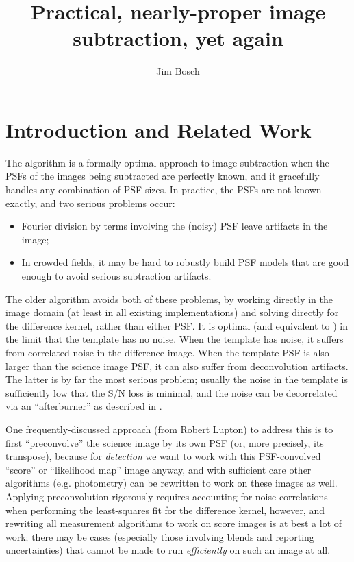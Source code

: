 \documentclass[DM,authoryear,toc]{lsstdoc}
\title{Practical, nearly-proper image subtraction, yet again}
\author{%
Jim Bosch
}
\date{\vcsDate}
\newcommand{\ZOGY}{\citetalias{2016ApJ...830...27Z}}
\newcommand{\AL}{\citetalias{1998ApJ...503..325A}}
\begin{document}
\mkshorttitle

\section{Introduction and Related Work}

The \ZOGY{} algorithm is a formally optimal approach to image subtraction when the PSFs of the images being subtracted are perfectly known, and it gracefully handles any combination of PSF sizes.
In practice, the PSFs are not known exactly, and two serious problems occur:
\begin{itemize}
  \item Fourier division by terms involving the (noisy) PSF leave artifacts in the image;
  \item In crowded fields, it may be hard to robustly build PSF models that are good enough to avoid serious subtraction artifacts.
\end{itemize}

The older \AL{} algorithm avoids both of these problems, by working directly in the image domain (at least in all existing implementations) and solving directly for the difference kernel, rather than either PSF.
It is optimal (and equivalent to \ZOGY{}) in the limit that the template has no noise.
When the template has noise, it suffers from correlated noise in the difference image.
When the template PSF is also larger than the science image PSF, it can also suffer from deconvolution artifacts.
The latter is by far the most serious problem; usually the noise in the template is sufficiently low that the S/N loss is minimal, and the noise can be decorrelated via an ``afterburner'' as described in .

One frequently-discussed approach (from Robert Lupton) to address this is to first ``preconvolve'' the science image by its own PSF (or, more precisely, its transpose), because for \emph{detection} we want to work with this PSF-convolved ``score'' or ``likelihood map'' image anyway, and with sufficient care other algorithms (e.g. photometry) can be rewritten to work on these images as well.
Applying preconvolution rigorously requires accounting for noise correlations when performing the least-squares fit for the difference kernel, however, and rewriting all measurement algorithms to work on score images is at best a lot of work; there may be cases (especially those involving blends and reporting uncertainties) that cannot be made to run \emph{efficiently} on such an image at all.
\end{document}
